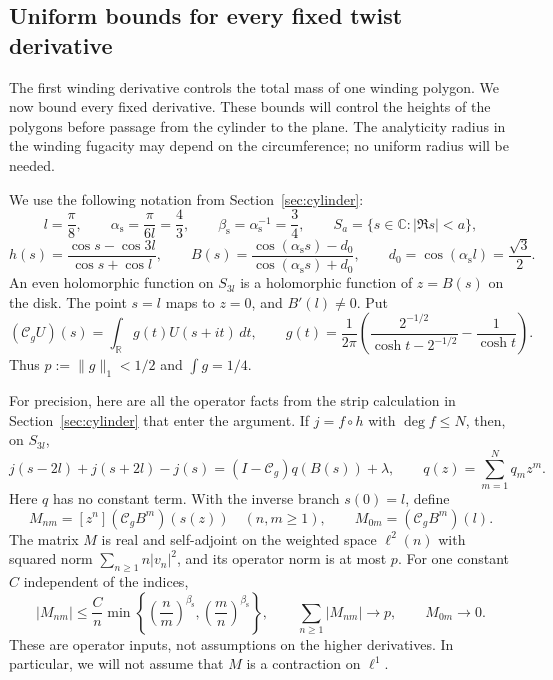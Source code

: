 \subsection{Uniform bounds for every fixed twist derivative}
\label{subsec:v-higher-twist-jets}

The first winding derivative controls the total mass of one winding
polygon.  We now bound every fixed derivative.  These bounds will control
the heights of the polygons before passage from the cylinder to the plane.
The analyticity radius in the winding fugacity may depend on the
circumference; no uniform radius will be needed.

We use the following notation from Section~\ref{sec:cylinder}:
\[
  l=\frac{\pi}{8},\qquad
 \alpha_{\mathrm s}=\frac{\pi}{6 l}=\frac43,\qquad
 \beta_{\mathrm s}=\alpha_{\mathrm s}^{-1}=\frac34,
 \qquad S_a=\{s\in\mathbb C:|\Re s|<a\},
\]
\[
 h(s)=\frac{\cos s-\cos3 l}{\cos s+\cos l},\qquad
 B(s)=\frac{\cos(\alpha_{\mathrm s}s)-d_0}
             {\cos(\alpha_{\mathrm s}s)+d_0},\qquad
 d_0=\cos(\alpha_{\mathrm s} l)=\frac{\sqrt3}{2}.
\]
An even holomorphic function on $S_{3 l}$ is a holomorphic function
of $z=B(s)$ on the disk.  The point $s= l$ maps to $z=0$, and
$B'( l)\ne0$.  Put
\[
 (\mathcal C_g   U)(s)=\int_{\mathbb R}g(t)U(s+it)\,dt,
 \qquad
 g(t)=\frac1{2\pi}
 \left(\frac{2^{-1/2}}{\cosh t-2^{-1/2}}-\frac1{\cosh t}\right).
\]
Thus $p:=\|g\|_1<1/2$ and $\int g=1/4$.

For precision, here are all the operator facts from the strip calculation in Section~\ref{sec:cylinder} that enter the argument.  If $j=f\circ h$ with $\deg f\le N$,
then, on $S_{3 l}$,
\begin{equation}\label{eq:v-jet-strip-representation}
 j(s-2 l)+j(s+2 l)-j(s)
       =(I-\mathcal C_g  )q(B(s))+\lambda,
 \qquad q(z)=\sum_{m=1}^N q_mz^m.
\end{equation}
Here $q$ has no constant term.  With the inverse branch $s(0)= l$, define
\[
 M_{nm}=[z^n](\mathcal C_g   B^m)(s(z))\quad(n,m\ge1),
 \qquad M_{0m}=(\mathcal C_g  B^m)( l).
\]
The matrix $M$ is real and self-adjoint on the weighted space
$\ell^2(n)$ with squared norm $\sum_{n\ge1}n|v_n|^2$, and its operator
norm is at most $p$.  For one constant $C$ independent of the indices,
\begin{equation}\label{eq:v-jet-matrix-inputs}
 |M_{nm}|\le\frac Cn
 \min\left\{\left(\frac nm\right)^{\beta_{\mathrm s}},
             \left(\frac mn\right)^{\beta_{\mathrm s}}\right\},
 \qquad
 \sum_{n\ge1}|M_{nm}|\longrightarrow p,
 \qquad M_{0m}\longrightarrow0.
\end{equation}
These are operator inputs, not assumptions on the higher derivatives.
In particular, we will not assume that $M$ is a contraction on $\ell^1$.

